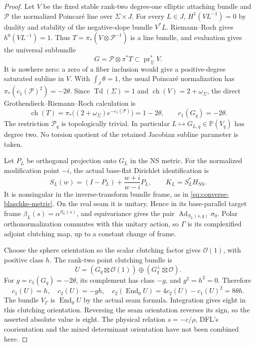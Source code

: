 \documentclass[11pt]{amsart}
\theoremstyle{definition}
\theoremstyle{remark}
\theoremstyle{plain}
\begin{document}
\begin{proof}
Let $V$ be the fixed stable rank-two degree-one elliptic
attaching bundle and $\mathscr P$ the normalized Poincar\'e
line over $\Sigma\times J$. For every $L\in J$,
$H^1(VL^{-1})=0$ by duality and stability of the negative-slope
bundle $V^*L$. Riemann--Roch gives $h^0(VL^{-1})=1$.
Thus $T=\pi_*(V\otimes\mathscr P^{-1})$ is a line bundle,
and evaluation gives the universal subbundle
\[
                  G=\mathscr P\otimes\pi^*T
                            \subset\operatorname{pr}_\Sigma^*V.
\]
It is nowhere zero: a zero of a fiber inclusion would give
a positive-degree saturated subline in $V$.
With $\int_J\theta=1$, the usual Poincar\'e normalization
has $\pi_*(c_1(\mathscr P)^2)=-2\theta$.
Since $\operatorname{Td}(\Sigma)=1$ and
$\operatorname{ch}(V)=2+\omega_\Sigma$, the direct
Grothendieck--Riemann--Roch calculation is
\begin{equation}\label{eq:elliptic-evaluated-subline}
 \operatorname{ch}(T)
  =\pi_*\bigl((2+\omega_\Sigma)e^{-c_1(\mathscr P)}\bigr)
  =1-2\theta,\qquad c_1(G_q)=-2\theta.
\end{equation}
The restriction $\mathscr P_q$ is topologically trivial.
In particular $L\mapsto G_{L,q}\in\mathbb P(V_q)$ has
degree two. No torsion quotient of the retained Jacobian
subline parameter is taken.

Let $P_L$ be orthogonal projection onto $G_L$ in the NS
metric. For the normalized modification point $-i$, the
actual base-flat Dirichlet identification is
\begin{equation}\label{eq:elliptic-seam-gauge}
 S_L(w)=(I-P_L)+\frac{w+i}{w-i}P_L,\qquad
                         K_L=S_L^*H_{\mathrm{NS}}.
\end{equation}
It is nonsingular in the inverse-transform bundle frame,
as in \eqref{eq:converse-blaschke-metric}.
On the real seam it is unitary. Hence in its base-parallel
target frame $\beta_L(s)=\alpha^{S_L(s)}$, and equivariance
gives the pair $\operatorname{Ad}_{S_L(s,q)}\sigma_0$.
Polar orthonormalization commutes with this unitary action,
so $\Gamma$ is its complexified adjoint clutching map, up
to a constant change of frame.

Choose the sphere orientation so the scalar clutching
factor gives $\mathcal O(1)$, with positive class $h$.
The rank-two point clutching bundle is
\[
        U=(G_q\boxtimes\mathcal O(1))\oplus
                                   (G_q^\perp\boxtimes\mathcal O).
\]
For $g=c_1(G_q)=-2\theta$, its complement has class $-g$,
and $g^2=h^2=0$. Therefore
\begin{equation}\label{eq:elliptic-adjoint-clutch}
 c_1(U)=h,\quad c_2(U)=-gh,\quad
 c_2(\operatorname{End}_0U)=4c_2(U)-c_1(U)^2
                                           =8\theta h.
\end{equation}
The bundle $V_\Gamma$ is $\operatorname{End}_0U$ by the
actual seam formula. Integration gives eight in this
clutching orientation. Reversing the seam orientation
reverses its sign, so the asserted absolute value is eight.
The physical relation $s=-c/\rho$, DFL's coorientation
and the mixed determinant orientation have not been
combined here.
\end{proof}
\end{document}
